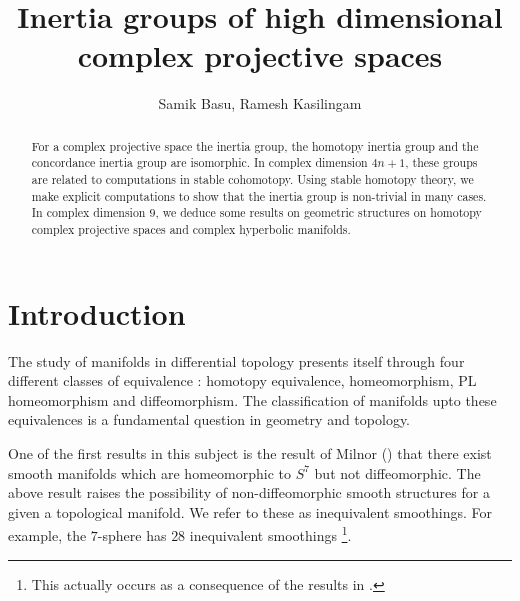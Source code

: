 \documentclass[a4paper,leqno,12pt]{amsart}
\theoremstyle{plain}
\theoremstyle{definition}
\numberwithin{equation}{section}
\begin{document}
\title{Inertia groups of high dimensional complex projective spaces}
\vspace{2cm}

\author{Samik Basu, Ramesh Kasilingam}

\address{Department of Mathematics,
Vivekananda University,
Belur, Howrah - 711202, West Bengal, India.}

\address{Statistics and Mathematics Unit,
Indian Statistical Institute,
Bangalore Centre, Bangalore - 560059, Karnataka, India.}

\date{}

\maketitle
\begin{abstract}
For a complex projective space the inertia group, the homotopy inertia group and the concordance inertia group are isomorphic. In complex dimension $4n+1$, these groups are related to computations in stable cohomotopy. Using stable homotopy theory, we make explicit computations to show that the inertia group is non-trivial in many cases. In complex dimension $9$, we deduce some results on geometric structures on homotopy complex projective spaces and complex hyperbolic manifolds.   
\end{abstract}

\section{Introduction}

The study of manifolds in differential topology presents itself through four different classes of equivalence : homotopy equivalence, homeomorphism, PL homeomorphism and diffeomorphism. The classification of manifolds upto these equivalences is a fundamental question in geometry and topology. 

One of the first results in this subject is the result of Milnor (\cite{Mil56}) that there exist smooth manifolds which are homeomorphic to $S^7$ but not diffeomorphic. The above result raises the possibility of non-diffeomorphic smooth structures for a given a topological manifold. We refer to these as inequivalent smoothings. For example, the $7$-sphere has $28$ inequivalent smoothings \footnote{This actually occurs as a consequence of the results in \cite{KM63}.}. 
\end{document}
